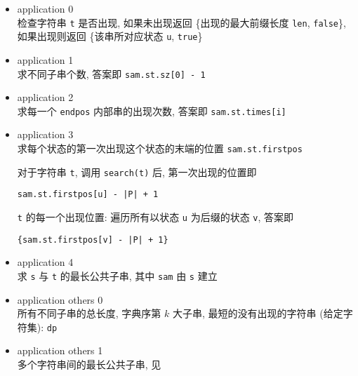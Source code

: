 \begin{itemize}
    \item application 0\\
          检查字符串 \verb|t| 是否出现, 如果未出现返回 \{出现的最大前缀长度 \verb|len|, \verb|false|\}, 如果出现则返回 \{该串所对应状态 \verb|u|, \verb|true|\}

    \item application 1\\
          求不同子串个数, 答案即 \verb|sam.st.sz[0] - 1|

    \item application 2\\
          求每一个 \verb|endpos| 内部串的出现次数, 答案即 \verb|sam.st.times[i]|

    \item application 3\\
          求每个状态的第一次出现这个状态的末端的位置 \verb|sam.st.firstpos|

          对于字符串 \verb|t|, 调用 \verb|search(t)| 后, 第一次出现的位置即 \begin{verbatim}sam.st.firstpos[u] - |P| + 1\end{verbatim}

          \verb|t| 的每一个出现位置: 遍历所有以状态 \verb|u| 为后缀的状态 \verb|v|, 答案即 \begin{verbatim}{sam.st.firstpos[v] - |P| + 1}\end{verbatim}

    \item application 4\\
          求 \verb|s| 与 \verb|t| 的最长公共子串, 其中 \verb|sam| 由 \verb|s| 建立

    \item application others 0\\
          所有不同子串的总长度, 字典序第 \(k\) 大子串, 最短的没有出现的字符串 (给定字符集): \verb|dp|

    \item application others 1\\
          多个字符串间的最长公共子串, 见 
\end{itemize}